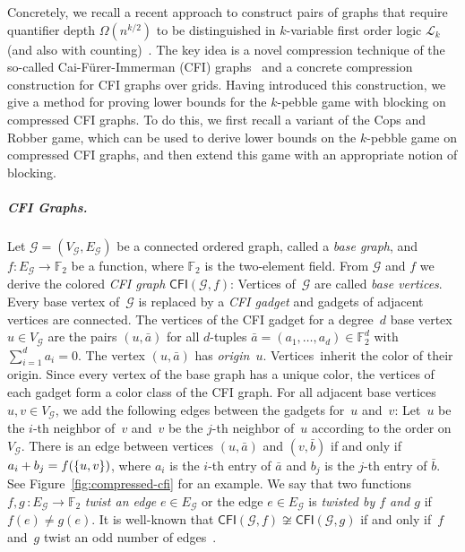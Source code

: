 \documentclass[10pt,a4paper]{article}
\newcommand{\defining}[1]{\emph{#1}}
\DeclarePairedDelimiter\set{\lbrace}{\rbrace}
\newcommand{\CFIsym}{\mathsf{CFI}}
\newcommand{\CFI}[1]{\CFIsym(#1)}
\newcommand{\FF}{\mathbb{F}}
\newcommand{\tup}[1]{\bar{#1}}
\newcommand{\iso}{\cong}
\newcommand{\klogic}[1]{\mathscr{L}_{#1}}
\newcommand{\graphG}{\mathcal{G}}
\newcommand{\vertexG}{V_{\graphG}}
\newcommand{\edgeG}{E_{\graphG}}
\newcommand{\confORfull}[2]{#1}
\begin{document}
Concretely, we recall a recent approach to construct pairs of graphs that
require quantifier depth $\Omega(n^{k/2})$
to be distinguished in
$k$-variable first order logic $\klogic{k}$ (and also with counting)~\cite{DBLP:conf/focs/GroheLNS23}.
The key idea is a novel compression technique of the so-called Cai-Fürer-Immerman (CFI) graphs~\cite{CaiFuererImmerman1992} and a concrete compression construction for CFI graphs over grids. Having introduced this construction, we give a method for proving lower bounds for the $k$-pebble game with blocking on compressed CFI graphs. To do this, we first recall a variant of the Cops and Robber game, which can be used to derive lower bounds on the $k$-pebble game on compressed CFI graphs, and then extend this game with an appropriate notion of blocking. 
%
%
%

\confORfull{}{\subsection{CFI Graphs, Compressions, and the Cops and Robber Game}}
\subparagraph*{CFI Graphs.}
Let $\graphG =(\vertexG, \edgeG)$ be a connected ordered graph, called a \defining{base graph},
and $f \colon \edgeG \to \FF_2$ be a function,
where $\FF_2$ is the two-element field.
From $\graphG$ and $f$
we derive the colored \defining{CFI graph} $\CFI{\graphG,f}$:
Vertices of~$\graphG$ are called \defining{base vertices}.
Every base vertex of~$\graphG$ is replaced by a \defining{CFI gadget}
and gadgets of adjacent vertices are connected.
The vertices of the CFI gadget for a degree~$d$ base vertex $u\in \vertexG$
are the pairs $(u,\tup{a})$ for all $d$-tuples $\tup{a} =(a_1, \dots, a_d) \in \FF_2^d$ with$\sum_{i=1}^d a_i = 0$.
The vertex $(u,\tup{a})$ has \defining{origin}~$u$. Vertices~inherit the color of their origin.
Since every vertex of the base graph has a unique color, the vertices of each gadget form a color class of the CFI graph.
For all adjacent base vertices $u,v \in \vertexG$,
we add the following edges between the gadgets for~$u$ and~$v$:
Let~$u$ be the $i$-th neighbor of~$v$
and~$v$ be the $j$-th neighbor of~$u$ according to the order on $\vertexG$.
There is an edge between vertices $(u, \tup{a})$ and $(v, \tup{b})$ if and only if $a_i + b_j = f(\set{u,v})$,
where $a_i$ is the $i$-th entry of $\tup{a}$ and $b_j$ is the $j$-th entry of $\tup{b}$. See Figure~\ref{fig:compressed-cfi} for an example.
We say that two functions $f,g \, \colon \edgeG \to \FF_2$
\defining{twist an edge} $e \in \edgeG$
or the edge $e\in \edgeG$ is \defining{twisted by $f$ and $g$}
if $f(e) \neq g(e)$.
It is well-known that $\CFI{\graphG,f} \not\iso\CFI{\graphG,g}$
if and only if~$f$ and~$g$ twist an odd number of edges~\cite{CaiFuererImmerman1992}.
\end{document}
